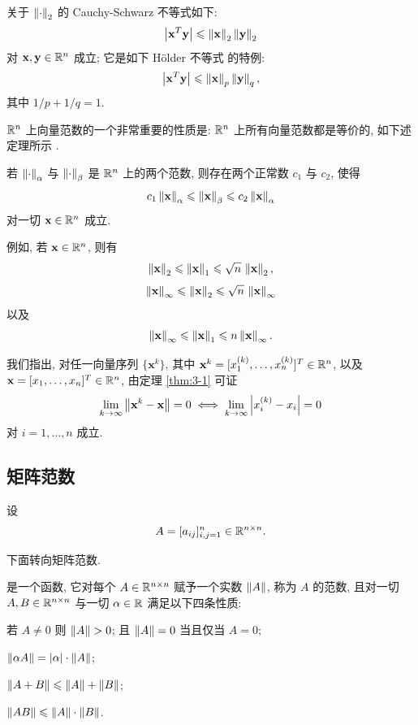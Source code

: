 关于 $\left\|\cdot\right\|_2$ 的 Cauchy-Schwarz 不等式如下:
\[
  \left|\mathbf{x}^T\mathbf{y}\right|\leqslant\left\|\mathbf{x}\right\|_2\left\|\mathbf{y}\right\|_2
\]
对 $\mathbf{x},\mathbf{y}\in\mathbb{R}^n$ 成立; 它是如下 Hölder 不等式 \cite{src:39} 的特例:
\[
  \left|\mathbf{x}^T\mathbf{y}\right|\leqslant\left\|\mathbf{x}\right\|_p\left\|\mathbf{y}\right\|_q,
\]
其中 $1/p+1/q=1$.

$\mathbb{R}^n$ 上向量范数的一个非常重要的性质是: $\mathbb{R}^n$ 上所有向量范数都是等价的, 如下述定理所示 \cite{src:75}.

\begin{theorem}
\label{thm:3-1}
若 $\left\|\cdot\right\|_\alpha$ 与 $\left\|\cdot\right\|_\beta$ 是 $\mathbb{R}^n$ 上的两个范数, 则存在两个正常数 $c_1$ 与 $c_2$, 使得
\[
  c_1\left\|\mathbf{x}\right\|_\alpha\leqslant\left\|\mathbf{x}\right\|_\beta\leqslant c_2\left\|\mathbf{x}\right\|_\alpha
\]
对一切 $\mathbf{x}\in\mathbb{R}^n$ 成立.
\end{theorem}

例如, 若 $\mathbf{x}\in\mathbb{R}^n$, 则有
\[
  \left\|\mathbf{x}\right\|_2\leqslant\left\|\mathbf{x}\right\|_1\leqslant\sqrt{n}\,\left\|\mathbf{x}\right\|_2,
\]
\[
  \left\|\mathbf{x}\right\|_\infty\leqslant\left\|\mathbf{x}\right\|_2\leqslant\sqrt{n}\,\left\|\mathbf{x}\right\|_\infty
\]
以及
\[
  \left\|\mathbf{x}\right\|_\infty\leqslant\left\|\mathbf{x}\right\|_1\leqslant n\left\|\mathbf{x}\right\|_\infty.
\]

我们指出, 对任一向量序列 $\{\mathbf{x}^k\}$, 其中 $\mathbf{x}^k=[x_1^{(k)},\ldots,x_n^{(k)}]^T\in\mathbb{R}^n$, 以及 $\mathbf{x}=[x_1,\ldots,x_n]^T\in\mathbb{R}^n$, 由定理 \ref{thm:3-1} 可证
\[
  \lim_{k\to\infty}\left\|\mathbf{x}^k-\mathbf{x}\right\|=0
  \iff
  \lim_{k\to\infty}\left|x_i^{(k)}-x_i\right|=0
\]
对 $i=1,\ldots,n$ 成立.

\subsection{矩阵范数}

设
\[
  A=[a_{ij}]_{i,j=1}^{n}\in\mathbb{R}^{n\times n}.
\]

下面转向矩阵范数.

\begin{definition}
\label{def:3-2}
是一个函数, 它对每个 $A\in\mathbb{R}^{n\times n}$ 赋予一个实数 $\left\|A\right\|$, 称为 $A$ 的范数, 且对一切 $A,B\in\mathbb{R}^{n\times n}$ 与一切 $\alpha\in\mathbb{R}$ 满足以下四条性质:
\begin{romanlist}
  \item 若 $A\neq0$ 则 $\norm{A}>0$; 且 $\left\|A\right\|=0$ 当且仅当 $A=0$;
  \item $\left\|\alpha A\right\|=|\alpha|\cdot\left\|A\right\|$;
  \item $\left\|A+B\right\|\leqslant\left\|A\right\|+\left\|B\right\|$;
  \item $\left\|AB\right\|\leqslant\left\|A\right\|\cdot\left\|B\right\|$.
\end{romanlist}
\end{definition}

